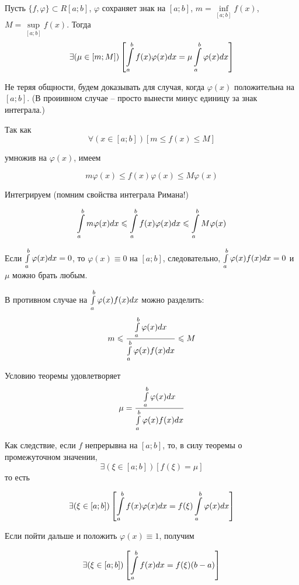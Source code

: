 \begin{teorema}
Пусть $\{f,\varphi\}\subset R[a;b]$, $\varphi$ сохраняет знак на $[a;b]$, $m=\inf\limits_{[a;b]}f(x)$, $M=\sup\limits_{[a;b]}f(x)$.
Тогда 
$$
\exists(\mu\in[m;M])\left[
\int\limits_a^b f(x)\varphi(x) dx=\mu\int\limits_a^b \varphi(x) dx
\right]
$$
\end{teorema}

\dokvo
Не теряя общности, будем доказывать для случая, когда $\varphi(x)$ положительна на $[a;b]$.
(В проиивном случае -- просто вынести минус единицу за знак интеграла.)

Так как
$$
\forall(x\in[a;b])[m\leq f(x)\leq M]
$$

умножив на $\varphi(x)$, имеем

$$
m\varphi(x)\leq f(x)\varphi(x) \leq M\varphi(x)
$$

Интегрируем (помним свойства интеграла Римана!)

$$
\int\limits_a^b m\varphi(x) dx \leqslant \int\limits_a^b f(x)\varphi(x) dx \leqslant \int\limits_a^b M\varphi(x)
$$

Если $\int\limits_a^b\varphi(x) dx =0$, то $\varphi(x)\equiv 0$ на $[a;b]$, следовательно, $\int\limits_a^b\varphi(x)f(x) dx=0$ и $\mu$ можно брать любым.

В противном случае на $\int\limits_a^b\varphi(x)f(x)dx$ можно разделить:
$$
m\leqslant\frac{\int\limits_a^b\varphi(x)dx }{\int\limits_a^b\varphi(x)f(x)dx }\leqslant M
$$

Условию теоремы удовлетворяет
$$
\mu=\frac{\int\limits_a^b\varphi(x)dx}{\int\limits_a^b\varphi(x)f(x)dx}
$$

\dokno

Как следствие, если $f$ непрерывна на $[a;b]$, то, в силу теоремы о промежуточном значении, 
$$
\exists(\xi\in[a;b])[f(\xi)=\mu]
$$
то есть 

$$
\exists(\xi\in[a;b])\left[
\int\limits_a^b f(x)\varphi(x) dx=f(\xi)\int\limits_a^b \varphi(x) dx
\right]
$$

Если пойти дальше и положить $\varphi(x)\equiv 1$, получим

$$
\exists(\xi\in[a;b])\left[
\int\limits_a^b f(x) dx=f(\xi)(b-a)
\right]
$$

